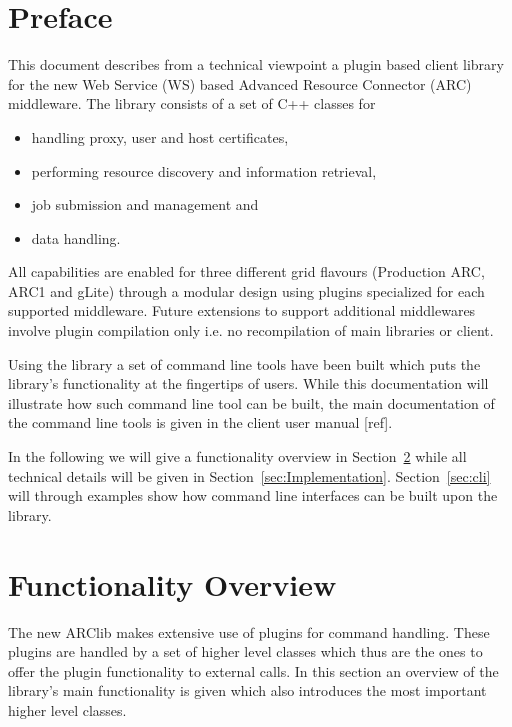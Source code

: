 \documentclass{book}
\begin{document}
\tableofcontents                          %
\newpage
\chapter{Preface}
\label{sec:intro}

This document describes from a technical viewpoint a plugin based client library for the new 
Web Service (WS) based Advanced Resource Connector (ARC) middleware. The library consists of 
a set of C++ classes for 

\begin{itemize}
\item{handling proxy, user and host certificates,}
\item{performing resource discovery and information retrieval,}
\item{job submission and management and}
\item{data handling.}
\end{itemize}

All capabilities are enabled for three different grid flavours (Production ARC, ARC1 and gLite) 
through a modular design using plugins specialized for each supported middleware. Future 
extensions to support additional middlewares involve plugin compilation only i.e. no recompilation 
of main libraries or client.

Using the library a set of command line tools have been built which puts the library's functionality 
at the fingertips of users. While this documentation will illustrate how such command line tool can be 
built, the main documentation of the command line tools is given in the client user manual [ref].

In the following we will give a functionality overview in Section~\ref{sec:FuncOver} while all technical 
details will be given in Section~\ref{sec:Implementation}. Section~\ref{sec:cli} will through examples 
show how command line interfaces can be built upon the library.

\chapter{Functionality Overview}
\label{sec:FuncOver}
The new ARClib makes extensive use of plugins for command handling. These plugins are handled by a set 
of higher level classes which thus are the ones to offer the plugin functionality to external calls. In 
this section an overview of the library's main functionality is given which also introduces the most 
important higher level classes.
\end{document}
